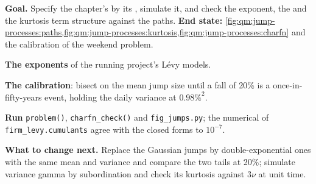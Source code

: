 \begin{tutorial}
\textbf{Goal.} Specify the chapter's  by its , simulate it, and
check the exponent, the  and the kurtosis term structure against the paths.
\textbf{End state:} \cref{fig:qm:jump-processes:paths,fig:qm:jump-processes:kurtosis,fig:qm:jump-processes:charfn}
and the calibration of the weekend problem.
\begin{tutsteps}
\item \textbf{The exponents} of the running project's Lévy models.
\label{lst:qm:jump-processes:psi}
\item \textbf{The calibration}: bisect on the mean jump size until a fall of 20\% is a
once-in-fifty-years event, holding the daily variance at $0.98\%^2$.
\label{lst:qm:jump-processes:calibrate}
\item \textbf{Run} \texttt{problem()}, \texttt{charfn\_check()} and \texttt{fig\_jumps.py}; the numerical
 of \texttt{firm\_levy.cumulants} agree with the closed forms to $10^{-7}$.
\end{tutsteps}
\textbf{What to change next.} Replace the Gaussian jumps by double-exponential ones with the same mean and
variance and compare the two tails at 20\%; simulate variance gamma by subordination and check its
kurtosis against $3\nu$ at unit time.
\end{tutorial}

